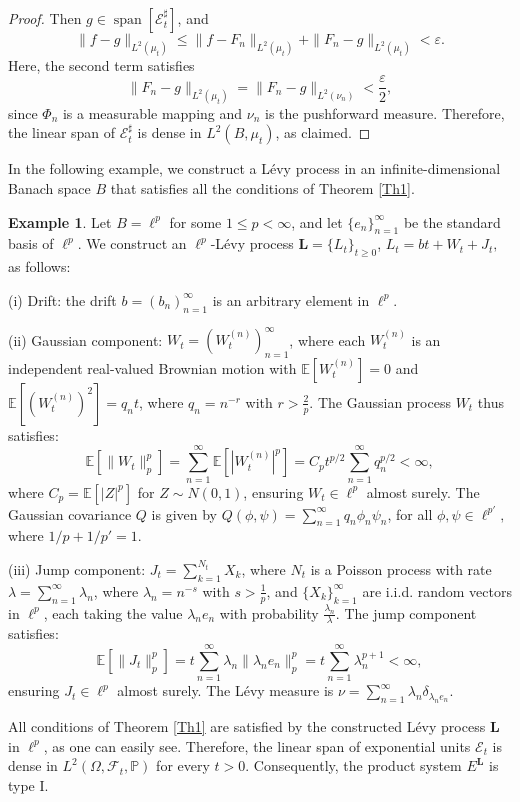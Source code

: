 \documentclass[11pt]{amsart}
\theoremstyle{definition}
\newtheorem{example}[theorem]{Example}
\theoremstyle{remark}
\numberwithin{equation}{section}
\begin{document}
\begin{proof}
Then \( g \in \operatorname{span}[\mathcal{E}_t^\sharp] \), and
\[
\| f - g \|_{L^2(\mu_t)} \leq \| f - F_n \|_{L^2(\mu_t)} + \| F_n - g \|_{L^2(\mu_t)} <  \varepsilon.
\]
Here, the second term satisfies
\[
\| F_n - g \|_{L^2(\mu_t)} = \| F_n - g \|_{L^2(\nu_n)} < \frac{\varepsilon}{2},
\]
since \( \Phi_n \) is a measurable mapping and \( \nu_n \) is the pushforward measure. Therefore, the linear span of \( \mathcal{E}_t^\sharp \) is dense in \( L^2(B, \mu_t) \), as claimed. \end{proof}



In the following example, we construct a L\'evy process in an infinite-dimensional Banach space \( B \) that satisfies all the conditions of Theorem \ref{Th1}.
\begin{example}\label{exm_corrected}
    Let \( B = \ell^p \) for some \( 1 \leq p < \infty \), and let \( \{ e_n \}_{n=1}^\infty \) be the standard basis of \( \ell^p \). We construct an  \( \ell^p \)-L\'evy process \( \bm{L} = \{ L_t \}_{t \geq 0} \), 
    \(
    L_t = b t + W_t + J_t,
    \)  as follows:
    
\indent (i) Drift: the drift \(b = (b_n)_{n=1}^\infty \) is an arbitrary element in \(\ell^p\).

(ii) Gaussian component: \( W_t = (W_t^{(n)})_{n=1}^\infty \), where each \( W_t^{(n)} \) is an independent real-valued Brownian motion with \( \mathbb{E}[ W_t^{(n)} ] = 0\) and \(\mathbb{E}[ (W_t^{(n)})^2 ] = q_n t\), where  \( q_n = n^{-r} \) with \( r > \frac{2}{p} \). The Gaussian process \( W_t \) thus satisfies:
            \[
            \mathbb{E}[ \| W_t \|_p^p ] = \sum_{n=1}^\infty \mathbb{E}[ |W_t^{(n)}|^p ] = C_p t^{p/2} \sum_{n=1}^\infty q_n^{p/2} < \infty,
            \]
where \( C_p = \mathbb{E}[ |Z|^p ] \) for \( Z \sim N(0,1) \), ensuring \( W_t \in \ell^p \) almost surely. The Gaussian covariance \(Q\) is given by \(Q(\phi, \psi) = \sum_{n=1}^\infty q_n \phi_n \psi_n\), for all \(\phi, \psi \in \ell^{p'},\) where \( 1/p + 1/p' = 1 \).
 
 (iii) Jump component: \( J_t = \sum_{k=1}^{N_t} X_k \), where \( N_t \) is a Poisson process with rate \( \lambda = \sum_{n=1}^\infty \lambda_n \), where \( \lambda_n = n^{-s} \) with \( s > \frac{1}{p} \), and  \( \{ X_k \}_{k=1}^\infty \) are i.i.d. random vectors in \( \ell^p \), each taking the value \( \lambda_n e_n \) with probability \( \frac{\lambda_n}{\lambda} \).  The jump component satisfies:
\[
            \mathbb{E}[ \| J_t \|_p^p ] = t \sum_{n=1}^\infty \lambda_n \| \lambda_n e_n \|_p^p = t \sum_{n=1}^\infty \lambda_n^{p+1} < \infty,
\]
ensuring \( J_t \in \ell^p \) almost surely. The L\'evy measure is \( \nu = \sum_{n=1}^\infty \lambda_n \delta_{\lambda_n e_n}.\)
        

All conditions of Theorem \ref{Th1} are satisfied by the constructed L\'evy process \( \bm{L} \) in \( \ell^p \), as one can easily see. Therefore, the linear span of exponential units
    \(
    \mathcal{E}_t 
    \)
    is dense in \( L^2(\Omega, \mathcal{F}_t, \mathbb{P}) \) for every \( t > 0 \). Consequently, the product system \(E^{\bm{L}}\) is type I.

\end{example}
\end{document}

